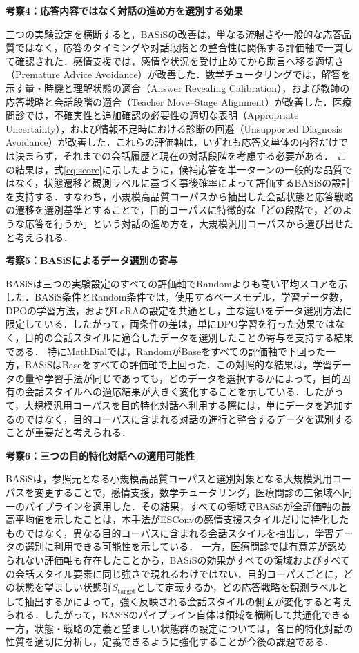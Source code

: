 \documentclass[manuscript,review,anonymous]{acmart}
\begin{document}
\noindent\textbf{考察4：応答内容ではなく対話の進め方を選別する効果}\par
三つの実験設定を横断すると，BASiSの改善は，単なる流暢さや一般的な応答品質ではなく，応答のタイミングや対話段階との整合性に関係する評価軸で一貫して確認された．感情支援では，感情や状況を受け止めてから助言へ移る適切さ（Premature Advice Avoidance）が改善した．数学チュータリングでは，解答を示す量・時機と理解状態の適合（Answer Revealing Calibration），および教師の応答戦略と会話段階の適合（Teacher Move--Stage Alignment）が改善した．医療問診では，不確実性と追加確認の必要性の適切な表明（Appropriate Uncertainty），および情報不足時における診断の回避（Unsupported Diagnosis Avoidance）が改善した．これらの評価軸は，いずれも応答文単体の内容だけでは決まらず，それまでの会話履歴と現在の対話段階を考慮する必要がある．
この結果は，式\eqref{eq:score}に示したように，候補応答を単一ターンの一般的な品質ではなく，状態遷移と観測ラベルに基づく事後確率によって評価するBASiSの設計を支持する．すなわち，小規模高品質コーパスから抽出した会話状態と応答戦略の遷移を選別基準とすることで，目的コーパスに特徴的な「どの段階で，どのような応答を行うか」という対話の進め方を，大規模汎用コーパスから選び出せたと考えられる．


\noindent\textbf{考察5：BASiSによるデータ選別の寄与}\par
BASiSは三つの実験設定のすべての評価軸でRandomよりも高い平均スコアを示した．BASiS条件とRandom条件では，使用するベースモデル，学習データ数，DPOの学習方法，およびLoRAの設定を共通とし，主な違いをデータ選別方法に限定している．したがって，両条件の差は，単にDPO学習を行った効果ではなく，目的の会話スタイルに適合したデータを選別したことの寄与を支持する結果である．
特にMathDialでは，RandomがBaseをすべての評価軸で下回った一方，BASiSはBaseをすべての評価軸で上回った．この対照的な結果は，学習データの量や学習手法が同じであっても，どのデータを選択するかによって，目的固有の会話スタイルへの適応結果が大きく変化することを示している．したがって，大規模汎用コーパスを目的特化対話へ利用する際には，単にデータを追加するのではなく，目的コーパスに含まれる対話の進行と整合するデータを選別することが重要だと考えられる．


\noindent\textbf{考察6：三つの目的特化対話への適用可能性}\par
BASiSは，参照元となる小規模高品質コーパスと選別対象となる大規模汎用コーパスを変更することで，感情支援，数学チュータリング，医療問診の三領域へ同一のパイプラインを適用した．その結果，すべての領域でBASiSが全評価軸の最高平均値を示したことは，本手法がESConvの感情支援スタイルだけに特化したものではなく，異なる目的コーパスに含まれる会話スタイルを抽出し，学習データの選別に利用できる可能性を示している．
一方，医療問診では有意差が認められない評価軸も存在したことから，BASiSの効果がすべての領域およびすべての会話スタイル要素に同じ強さで現れるわけではない．目的コーパスごとに，どの状態を望ましい状態群$S_{\mathrm{target}}$として定義するか，どの応答戦略を観測ラベルとして抽出するかによって，強く反映される会話スタイルの側面が変化すると考えられる．したがって，BASiSのパイプライン自体は領域を横断して共通化できる一方，状態・戦略の定義と望ましい状態群の設定については，各目的特化対話の性質を適切に分析し，定義できるように強化することが今後の課題である．
\end{document}
